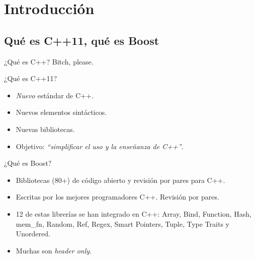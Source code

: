 \documentclass[8pt,xcolor=svgnames]{beamer}
\begin{document}
\begin{frame}
  \titlepage
\end{frame}


\normalsize



\section{Introducción}

\subsection{Qué es C++11, qué es Boost}

\begin{frame}

  \begin{block}{¿Qué es C++?}
    Bitch, please.   
  \end{block}

  \pause

  \begin{block}{¿Qué es C++11?}
    \begin{itemize}
    \item \textit{Nuevo} estándar de C++.
    \item Nuevos elementos sintácticos.
    \item Nuevas bibliotecas.
    \item Objetivo: \textit{``simplificar el uso y la enseñanza de C++''}.
    \end{itemize}
  \end{block}

  \pause

  \begin{block}{¿Qué es Boost?}
    \begin{itemize}
    \item Bibliotecas (80+) de código abierto y revisión por pares para C++.
    \item Escritas por los mejores programadores C++. Revisión por pares.
    \item 12 de estas librerías se han integrado en C++: Array,
      Bind, Function, Hash, mem\_fn, Random, Ref, Regex, Smart Pointers, Tuple,
      Type Traits y Unordered.
    \item Muchas son \textit{header only}.
    \end{itemize}
  \end{block}
\end{frame}
\end{document}
